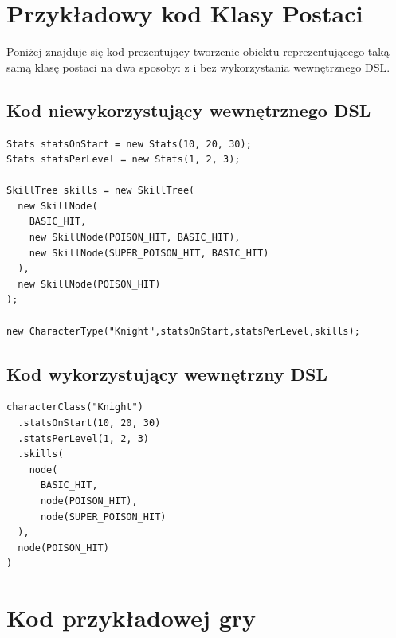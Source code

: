 \documentclass[openright]{xmgr}
\begin{document}
\appendix

\chapter{Przykładowy kod Klasy Postaci}
Poniżej znajduje się kod prezentujący tworzenie obiektu reprezentującego taką samą klasę postaci na dwa sposoby: z i bez wykorzystania wewnętrznego DSL.
\section*{Kod niewykorzystujący wewnętrznego DSL}
\begin{verbatim}
Stats statsOnStart = new Stats(10, 20, 30);
Stats statsPerLevel = new Stats(1, 2, 3);

SkillTree skills = new SkillTree(
  new SkillNode(
    BASIC_HIT,
    new SkillNode(POISON_HIT, BASIC_HIT),
    new SkillNode(SUPER_POISON_HIT, BASIC_HIT)
  ),
  new SkillNode(POISON_HIT)
);

new CharacterType("Knight",statsOnStart,statsPerLevel,skills);
\end{verbatim}
\section*{Kod wykorzystujący wewnętrzny DSL}
\begin{verbatim}
characterClass("Knight")  
  .statsOnStart(10, 20, 30)
  .statsPerLevel(1, 2, 3)
  .skills(
    node(
      BASIC_HIT,
      node(POISON_HIT),
      node(SUPER_POISON_HIT)
  ),
  node(POISON_HIT)
)
\end{verbatim}


\chapter{Kod przykładowej gry}
\end{document}
